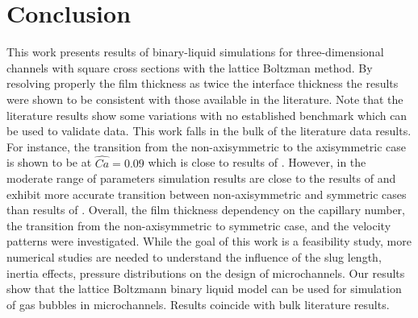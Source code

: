 \documentclass[preprint,12pt]{elsarticle}
\begin{document}
\section{Conclusion}
This work presents results of binary-liquid simulations for three-dimensional channels with square
cross sections with the lattice Boltzman method. By resolving properly the film thickness as twice the
interface thickness \cite{kuzmin-binary2d} the results were shown to be consistent with those
available in the literature. Note that the literature results show some variations with
no established benchmark which can be used to validate data. This work falls in the bulk of the
literature data results. For instance, the  transition from the non-axisymmetric to the
axisymmetric case is shown to be at $\widehat{Ca}=0.09$ which is close to results of
\citet{wang-non-circular}. However, in the moderate range of parameters simulation results are
close to the results of \citet{heil-threedim} and exhibit more accurate transition between
non-axisymmetric and symmetric cases than results of \citet{wang-non-circular}. Overall, the film
thickness dependency on the capillary number, the
transition from the non-axisymmetric to symmetric case, and the velocity patterns were investigated.
While
the goal of this work is a feasibility study, more numerical studies are needed to
understand the influence of the slug length, inertia effects, pressure distributions
\cite{kreutzer-taylor,yue-mass} on the design of microchannels. Our results show that the lattice
Boltzmann binary liquid model can be used for simulation of gas bubbles in microchannels. Results
coincide with bulk literature results. 

\appendix
\end{document}
